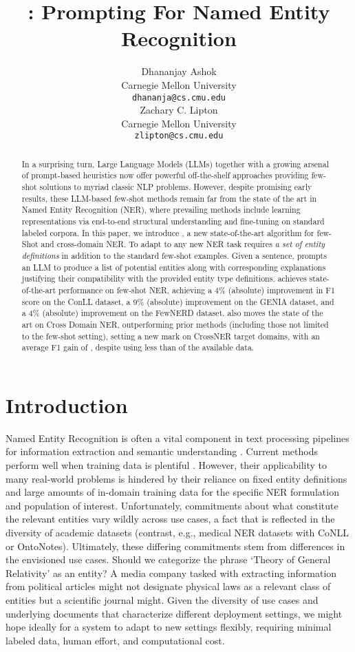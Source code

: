 \documentclass[11pt]{article}
\title{\toolname: Prompting For Named Entity Recognition}
\author{Dhananjay Ashok \\
  Carnegie Mellon University\\
  \texttt{dhananja@cs.cmu.edu} \\\And
  Zachary C. Lipton \\
    Carnegie Mellon University\\
  \texttt{zlipton@cs.cmu.edu} \\}
\begin{document}
\maketitle
\begin{abstract}
In a surprising turn, Large Language Models (LLMs) together with a growing arsenal of prompt-based heuristics
now offer powerful off-the-shelf approaches providing few-shot solutions to myriad classic NLP problems. 
However, despite promising early results, these LLM-based few-shot methods remain far from the state of the art in Named Entity Recognition (NER), where prevailing methods include learning representations via end-to-end structural understanding and fine-tuning on standard labeled corpora. 
In this paper, we introduce \toolname, 
 a new state-of-the-art algorithm for few-Shot and cross-domain NER. To adapt to any new NER task \toolname requires \emph{a set of entity definitions} in addition to the standard few-shot examples. 
Given a sentence, \toolname prompts an LLM to produce  a list of potential entities along with corresponding explanations justifying their compatibility with the provided entity type definitions. 
\toolname achieves state-of-the-art performance on few-shot NER,
achieving a 4\% (absolute) improvement in F1 score on the ConLL dataset, a 9\% (absolute) improvement on the GENIA dataset, and a 4\% (absolute) improvement on the FewNERD dataset.
\toolname also moves the state of the art on Cross Domain NER, outperforming prior methods (including those not limited to the few-shot setting), setting a new mark on  CrossNER target domains, with an average F1 gain of , despite using less than  of the available data. \end{abstract}


\section{Introduction}
Named Entity Recognition \citep{chinchor1995muc} is often a vital component 
in text processing pipelines for information extraction and semantic understanding
\citep{sharma2022named, ali2022named}. 
Current methods perform well when training data is plentiful
\citep{wang2022deepstruct, yu2020named, li2022unified, wang2020automated}.
However, their applicability to many real-world problems
is hindered by their reliance on fixed entity definitions
and large amounts of in-domain training data
for the specific NER formulation and population of interest.
Unfortunately, commitments about what constitute the relevant entities
vary wildly across use cases, a fact that is reflected
in the diversity of academic datasets
(contrast, e.g., medical NER datasets with CoNLL or OntoNotes). 
Ultimately, these differing commitments 
stem from differences in the envisioned use cases.
Should we categorize the phrase `Theory of General Relativity' as an entity? 
A media company tasked with extracting 
information from political articles
might not designate physical laws
as a relevant class of entities
but a scientific journal might. 
Given the diversity of use cases 
and underlying documents
that characterize different deployment settings,
we might hope ideally for a system to adapt to new settings flexibly,
requiring minimal labeled data, 
human effort, and computational cost. 
\end{document}
